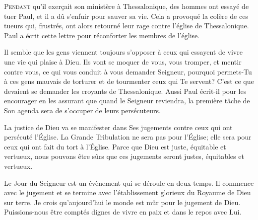 
\lettrine{P}{endant} qu'il exer\c{c}ait son ministère à Thessalonique,
 des hommes ont essayé de tuer Paul, et il a dû s'enfuir pour sauver sa vie.
 Cela a provoqué la colère de ces tueurs qui, frustrés, ont alors retourné
 leur rage contre l'église de Thessalonique. Paul a écrit cette lettre
 pour réconforter les membres de l'église.

Il semble que les gens viennent toujours s'opposer à ceux qui essayent
 de vivre une vie qui plaise à Dieu. Ils vont se moquer de vous, vous tromper,
 et mentir contre vous, ce qui vous conduit à vous demander\frcolon{} 
 \Og Seigneur, pourquoi permets-Tu  à ces gens mauvais de torturer
 et de tourmenter ceux qui Te servent? \Fg{} 
 C'est ce que devaient se demander les croyants de Thessalonique.
 Aussi Paul écrit-il pour les encourager en les assurant que quand le Seigneur
 reviendra, la première tâche de Son agenda sera de s'occuper
 de leurs persécuteurs.


La justice de Dieu va se manifester dans Ses jugements contre ceux
 qui ont persécuté l'Église. La Grande Tribulation ne sera pas pour l'Église;
 elle sera pour ceux qui ont fait du tort à l'Église.
 Parce que Dieu est juste, équitable et vertueux, nous pouvons être sûrs
 que ces jugements seront justes, équitables et vertueux.

Le Jour du Seigneur est un évènement qui se déroule en
 deux temps. Il commence avec le jugement et se termine avec l'établissement
 glorieux du Royaume de Dieu sur terre. Je crois qu'aujourd'hui le monde
 est mûr pour le jugement de Dieu. Puissions-nous être comptés dignes de vivre
 en paix et dans le repos avec Lui.

\dvrule




